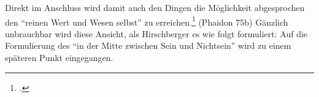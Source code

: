 Direkt im Anschluss wird damit auch den Dingen die Möglichkeit abgesprochen den \enquote{reinen Wert und Wesen selbst} zu erreichen.\footcite[vgl.][S. 100]{Hirschberger} (Phaidon 75b)
Gänzlich unbrauchbar wird diese Ansicht, als Hirschberger es wie folgt formuliert:
Auf die Formulierung des \enquote{in der Mitte zwischen Sein und Nichtsein} wird zu einem späteren Punkt eingegangen.
